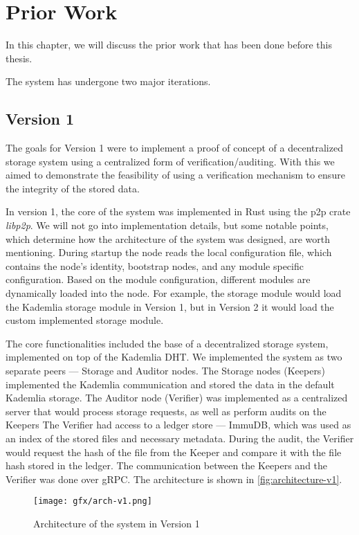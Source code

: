 \chapter{Prior Work}
\label{cha:prior-work}

In this chapter, we will discuss the prior work that has been done before this thesis.

The system has undergone two major iterations.

\section{Version 1}

The goals for Version 1 were to implement a proof of concept of a decentralized storage system
using a centralized form of verification/auditing.
With this we aimed to demonstrate the feasibility of using a verification mechanism to
ensure the integrity of the stored data.

In version 1, the core of the system was implemented in Rust using the
p2p crate \textit{libp2p}.
We will not go into implementation details, but some notable points, which determine how the architecture
of the system was designed, are worth mentioning.
During startup the node reads the local configuration file, which contains the node's identity,
bootstrap nodes, and any module specific configuration.
Based on the module configuration, different modules are dynamically loaded into the node.
For example, the storage module would load the Kademlia storage module in Version 1,
but in Version 2 it would load the custom implemented storage module.

The core functionalities included the base of a decentralized storage system,
implemented on top of the Kademlia DHT.
We implemented the system as two separate peers --- Storage and Auditor nodes.
The Storage nodes (Keepers) implemented the Kademlia communication and stored the data in the
default Kademlia storage.
The Auditor node (Verifier) was implemented as a centralized server that would process storage requests,
as well as perform audits on the Keepers
The Verifier had access to a ledger store --- ImmuDB,
which was used as an index of the stored files and necessary metadata.
During the audit, the Verifier would request the hash of the file from the Keeper
and compare it with the file hash stored in the ledger.
The communication between the Keepers and the Verifier was done over gRPC.
The architecture is shown in \autoref{fig:architecture-v1}.

\begin{figure}
    \centering
    \texttt{[image: gfx/arch-v1.png]}
    \caption{Architecture of the system in Version 1}
    \label{fig:architecture-v1}
\end{figure}

